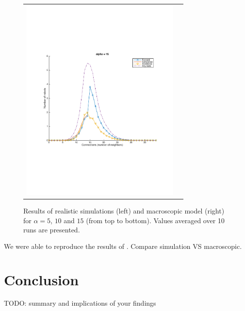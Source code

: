 \documentclass[a4paper, 10pt, conference]{ieeeconf}
\begin{document}
\begin{figure}[p]
\begin{center}
\begin{tabular}{lr}
        \includegraphics[width=8cm]{figures/macroscopic-40-alpha-15.pdf}
      \end{tabular}
      \caption{Results of realistic simulations (left) and macroscopic model (right) for $\alpha = 5$, $10$ and $15$ (from top to bottom). Values averaged over 10 runs are presented.}
    \end{center}
  \end{figure}

  We were able to reproduce the results of \cite{Winfield08}. Compare simulation VS macroscopic.


\section{Conclusion}
  TODO: summary and implications of your findings


\end{document}
